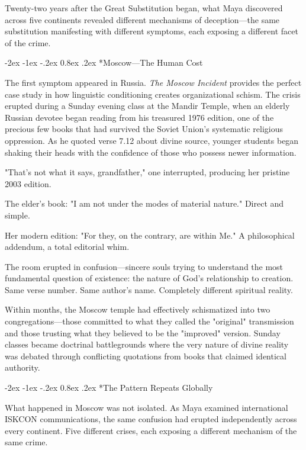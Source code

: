 \documentclass[12pt,twoside]{book}
\makeatletter
\let\oldsubsection\subsection
\renewcommand{\subsection}[1]{\needspace{3\baselineskip}\oldsubsection{#1}}
\renewcommand\subsection{\@startsection{subsection}{2}{\z@}%
{-2ex \@plus -1ex \@minus -.2ex}%
{0.8ex \@plus .2ex}%
{\normalfont\large\bfseries}}
\makeatother
\begin{document}
Twenty-two years after the Great Substitution began, what Maya discovered across five continents revealed different mechanisms of deception—the same substitution manifesting with different symptoms, each exposing a different facet of the crime.

\vspace{0.1cm}
\subsection*{Moscow—The Human Cost}

The first symptom appeared in Russia. \emph{The Moscow Incident} provides the perfect case study in how linguistic conditioning creates organizational schism. The crisis erupted during a Sunday evening class at the Mandir Temple, when an elderly Russian devotee began reading from his treasured 1976 edition, one of the precious few books that had survived the Soviet Union's systematic religious oppression. As he quoted verse 7.12 about divine source, younger students began shaking their heads with the confidence of those who possess newer information.

"That's not what it says, grandfather," one interrupted, producing her pristine 2003 edition.

The elder's book: "I am not under the modes of material nature." Direct and simple.

Her modern edition: "For they, on the contrary, are within Me." A philosophical addendum, a total editorial whim.

The room erupted in confusion—sincere souls trying to understand the most fundamental question of existence: the nature of God's relationship to creation. Same verse number. Same author's name. Completely different spiritual reality.

Within months, the Moscow temple had effectively schismatized into two congregations—those committed to what they called the "original" transmission and those trusting what they believed to be the "improved" version. Sunday classes became doctrinal battlegrounds where the very nature of divine reality was debated through conflicting quotations from books that claimed identical authority.

\vspace{0.1cm}
\subsection*{The Pattern Repeats Globally}

What happened in Moscow was not isolated. As Maya examined international ISKCON communications, the same confusion had erupted independently across every continent. Five different crises, each exposing a different mechanism of the same crime.
\end{document}
